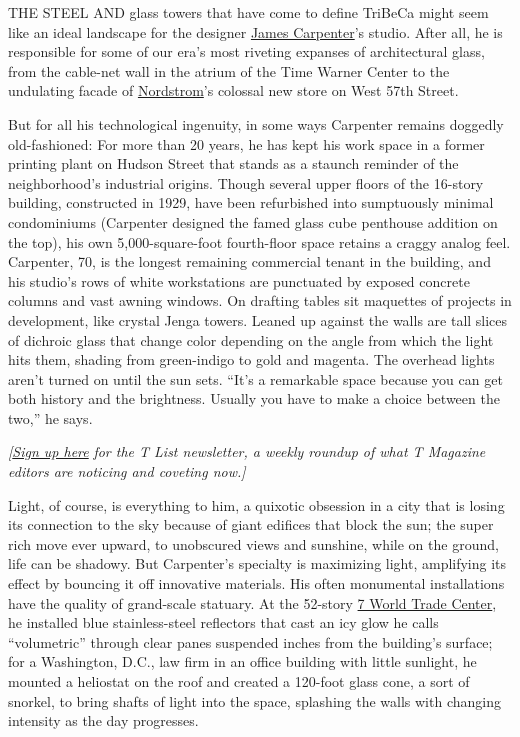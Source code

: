 THE STEEL AND glass towers that have come to define TriBeCa might seem
like an ideal landscape for the designer
\href{https://www.nytimes3xbfgragh.onion/2010/08/01/arts/design/01carpenter.html}{James
Carpenter}'s studio. After all, he is responsible for some of our era's
most riveting expanses of architectural glass, from the cable-net wall
in the atrium of the Time Warner Center to the undulating facade of
\href{https://www.nytimes3xbfgragh.onion/2019/10/23/style/nordstrom-family-department-stores.html}{Nordstrom}'s
colossal new store on West 57th Street.

But for all his technological ingenuity, in some ways Carpenter remains
doggedly old-fashioned: For more than 20 years, he has kept his work
space in a former printing plant on Hudson Street that stands as a
staunch reminder of the neighborhood's industrial origins. Though
several upper floors of the 16-story building, constructed in 1929, have
been refurbished into sumptuously minimal condominiums (Carpenter
designed the famed glass cube penthouse addition on the top), his own
5,000-square-foot fourth-floor space retains a craggy analog feel.
Carpenter, 70, is the longest remaining commercial tenant in the
building, and his studio's rows of white workstations are punctuated by
exposed concrete columns and vast awning windows. On drafting tables sit
maquettes of projects in development, like crystal Jenga towers. Leaned
up against the walls are tall slices of dichroic glass that change color
depending on the angle from which the light hits them, shading from
green-indigo to gold and magenta. The overhead lights aren't turned on
until the sun sets. ``It's a remarkable space because you can get both
history and the brightness. Usually you have to make a choice between
the two,'' he says.

\emph{{[}}\href{https://www.nytimes3xbfgragh.onion/newsletters/t-list?module=inline}{\emph{Sign
up here}} \emph{for the T List newsletter, a weekly roundup of what T
Magazine editors are noticing and coveting now.{]}}

Light, of course, is everything to him, a quixotic obsession in a city
that is losing its connection to the sky because of giant edifices that
block the sun; the super rich move ever upward, to unobscured views and
sunshine, while on the ground, life can be shadowy. But Carpenter's
specialty is maximizing light, amplifying its effect by bouncing it off
innovative materials. His often monumental installations have the
quality of grand-scale statuary. At the 52-story
\href{https://www.nytimes3xbfgragh.onion/2004/05/05/nyregion/rising-above-ground-zero-tower-slowly-takes-shape.html}{7
World Trade Center}, he installed blue stainless-steel reflectors that
cast an icy glow he calls ``volumetric'' through clear panes suspended
inches from the building's surface; for a Washington, D.C., law firm in
an office building with little sunlight, he mounted a heliostat on the
roof and created a 120-foot glass cone, a sort of snorkel, to bring
shafts of light into the space, splashing the walls with changing
intensity as the day progresses.

